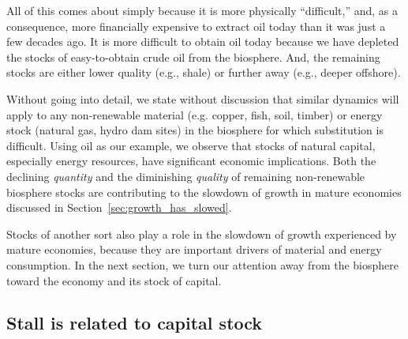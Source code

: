 All of this comes about simply because it is 
more physically ``difficult,'' and, as a consequence, 
more financially expensive
to extract oil today than it was just a few decades ago.
It is more difficult to obtain oil today because we have depleted
the stocks of easy-to-obtain crude oil from the biosphere.
And, the remaining stocks are either lower quality (e.g., shale)
or further away (e.g., deeper offshore).

Without going into detail, we state without discussion 
that similar dynamics will apply to 
any non-renewable material (e.g. copper, fish, soil, timber) 
or energy stock (natural gas, hydro dam sites)
in the biosphere
for which substitution is difficult.
Using oil as our example, we observe that 
stocks of natural capital, especially energy resources,
have significant economic implications.
Both the declining \emph{quantity} and 
the diminishing \emph{quality} of remaining non-renewable biosphere stocks 
are contributing to the slowdown of growth in mature economies
discussed in Section~\ref{sec:growth_has_slowed}.

Stocks of another sort also play a role 
in the slowdown of growth experienced by mature economies,
because they  are important drivers of material and energy consumption.
In the next section, we turn our attention 
away from the biosphere 
toward the economy and its stock of capital.


\subsection{Stall is related to capital stock}
\label{sec:stall_capital_stock}

